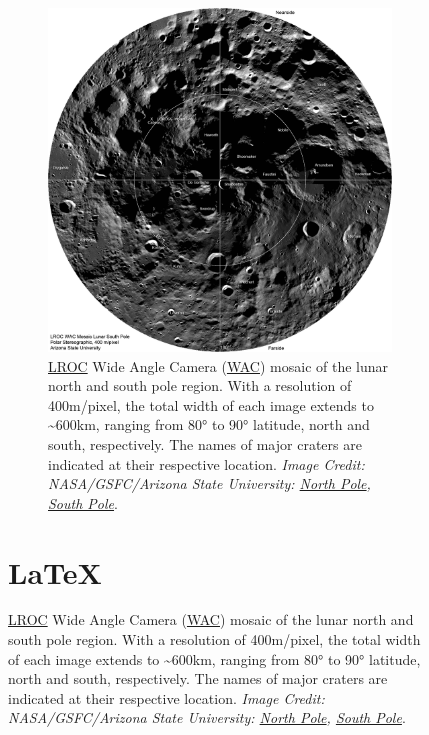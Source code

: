 \documentclass[
  letterpaper,
  DIV=11,
  numbers=noendperiod,
  oneside]{scrartcl}
\begin{document}
\begin{figure}
\begin{figure}
\begin{minipage}[t]{0.50\linewidth}
{{\includegraphics{imgs/LROC_poles/LROC_south_pole.jpg}

}

}

\end{minipage}%

\caption{\label{fig-LROC_poles}\href{/documentation/acronyms.qmd}{LROC}
Wide Angle Camera (\href{/documentation/acronyms.qmd}{WAC}) mosaic of
the lunar north and south pole region. With a resolution of 400m/pixel,
the total width of each image extends to \textasciitilde600km, ranging
from 80° to 90° latitude, north and south, respectively. The names of
major craters are indicated at their respective location. \emph{Image
Credit: NASA/GSFC/Arizona State University:
\href{http://lroc.sese.asu.edu/posts/242}{North Pole},
\href{http://lroc.sese.asu.edu/posts/237\%3E}{South Pole}}.}

\end{figure}

\section{\texorpdfstring{ LaTeX}{ LaTeX}}


\end{figure}
\end{document}
